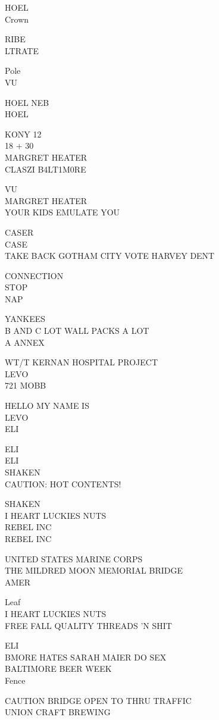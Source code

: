 \documentclass[10pt,letterpaper]{article}
\begin{document}
HOEL\\
Crown

RIBE\\
LTRATE

Pole\\
VU

HOEL NEB\\
HOEL

KONY 12\\
18 + 30\\
MARGRET HEATER\\
CLASZI B4LT1M0RE

VU\\
MARGRET HEATER\\
YOUR KIDS EMULATE YOU

CASER\\
CASE\\
TAKE BACK GOTHAM CITY VOTE HARVEY DENT

CONNECTION\\
STOP\\
NAP

YANKEES\\
B AND C LOT WALL PACKS A LOT\\
A ANNEX

WT/T KERNAN HOSPITAL PROJECT\\
LEVO\\
721 MOBB

HELLO MY NAME IS\\
LEVO\\
ELI

ELI\\
ELI\\
SHAKEN\\
CAUTION: HOT CONTENTS!

SHAKEN\\
I HEART LUCKIES NUTS\\
REBEL INC\\
REBEL INC

UNITED STATES MARINE CORPS\\
THE MILDRED MOON MEMORIAL BRIDGE\\
AMER

Leaf\\
I HEART LUCKIES NUTS\\
FREE FALL QUALITY THREADS 'N SHIT

ELI\\
BMORE HATES SARAH MAIER DO SEX\\
BALTIMORE BEER WEEK\\
Fence

CAUTION BRIDGE OPEN TO THRU TRAFFIC\\
UNION CRAFT BREWING
\end{document}
